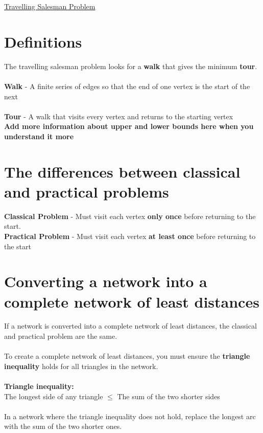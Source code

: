 \documentclass{article}[18pt]
\begin{document}
\begin{center}
\underline{\huge Travelling Salesman Problem}
\end{center}
\section{Definitions}
The travelling salesman problem looks for a \textbf{walk} that gives the minimum \textbf{tour}.\\
\\
\textbf{Walk} - A finite series of edges so that the end of one vertex is the start of the next\\
\\
\textbf{Tour} - A walk that visits every vertex and returns to the starting vertex
\\
\textbf{Add more information about upper and lower bounds here when you understand it more}
\section{The differences between classical and practical problems}
\textbf{Classical Problem} - Must visit each vertex \textbf{only once} before returning to the start.\\
\textbf{Practical Problem} - Must visit each vertex \textbf{at least once} before returning to the start
\section{Converting a network into a complete network of least distances}
If a network is converted into a complete network of least distances, the classical and practical problem are the same.\\
\\
To create a complete network of least distances, you must ensure the \textbf{triangle inequality} holds for all triangles in the network.\\
\\
\textbf{Triangle inequality:}\\
The longest side of any triangle $\leqslant$ The sum of the two shorter sides\\
\\
In a network where the triangle inequality does not hold, replace the longest arc with the sum of the two shorter ones.
\end{document}

